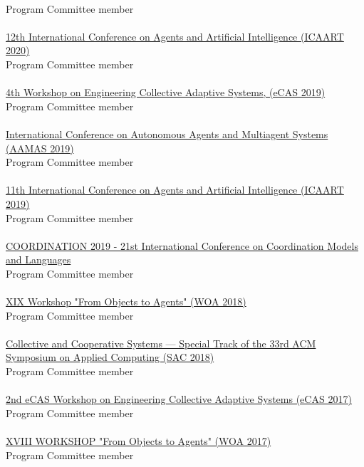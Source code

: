 \\ Program Committee member \\
\halfblankline \\
\href{http://www.icaart.org/?y=2020}{12th International Conference on Agents and Artificial Intelligence
(ICAART 2020)}
\\ Program Committee member \\
\halfblankline \\
\href{http://apice.unibo.it/xwiki/bin/view/ECAS2019/Committees}{4th Workshop on Engineering Collective Adaptive Systems, (eCAS 2019)}
\\ Program Committee member \\
\halfblankline \\
\href{http://aamas2019.encs.concordia.ca/}{International Conference on Autonomous Agents and
Multiagent Systems (AAMAS 2019)}
\\ Program Committee member \\
\halfblankline \\
\href{http://www.icaart.org/?y=2019}{11th International Conference on Agents and Artificial Intelligence
(ICAART 2019)}
\\ Program Committee member \\
\halfblankline \\
\href{http://www.discotec.org/2019/coordination}{COORDINATION 2019 - 21st International Conference on Coordination Models and Languages}
\\ Program Committee member \\
\halfblankline \\
\href{http://diid.unipa.it/roboticslab/woa2018/}{XIX Workshop "From Objects to Agents" (WOA 2018)}
\\ Program Committee member \\
\halfblankline \\
\href{http://sac-cas2018.apice.unibo.it/referees.html}{Collective and Cooperative Systems --- Special Track of the 33rd ACM Symposium on Applied Computing (SAC 2018)}
\\ Program Committee member \\
\halfblankline \\
\href{http://apice.unibo.it/xwiki/bin/view/ECAS2017/WebHome}{2nd eCAS Workshop on Engineering Collective Adaptive Systems (eCAS 2017)}
\\ Program Committee member \\
\halfblankline \\
\href{http://woa2017.unirc.it/}{XVIII WORKSHOP "From Objects to Agents" (WOA 2017)}
\\ Program Committee member \\

